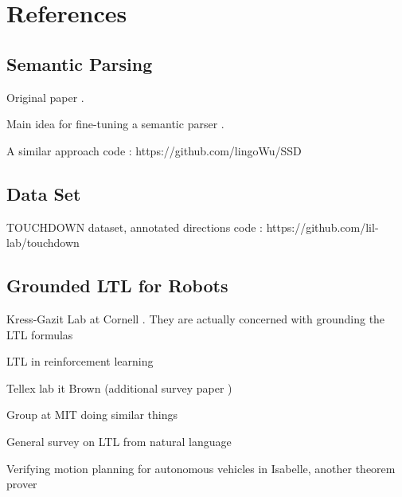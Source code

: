 \documentclass[a4paper, 11pt]{article}
\begin{document}

\section{References} 

\subsection{Semantic Parsing} 

Original paper \cite{berant-liang-2014-semantic}. 

Main idea for fine-tuning a semantic parser  \cite{fewShotSem}.


A similar approach \cite{wu-etal-2021-paraphrasing}
code : https://github.com/lingoWu/SSD

\subsection{Data Set} 

TOUCHDOWN dataset, annotated directions  \cite{chen2019touchdown}
code : https://github.com/lil-lab/touchdown

\subsection{Grounded LTL for Robots} 

Kress-Gazit Lab at Cornell \cite{provCorrectNatControl} \cite{7759412}. They are actually concerned with grounding the LTL formulas

LTL in reinforcement learning \cite{ltlRein} 

Tellex lab it Brown \cite{patellearning} \cite{9197068} \cite{hsiung2021generalizing} \cite{tellexInstr} (additional survey paper \cite{MARGE2022101255})

Group at MIT doing similar things \cite{ltlSemParse} \cite{kuo2020deep}

General survey on LTL from natural language \cite{brunello_et_al}

Verifying motion planning for autonomous vehicles in Isabelle, another theorem prover \cite{verifiedMotion}
\printbibliography
\end{document}
